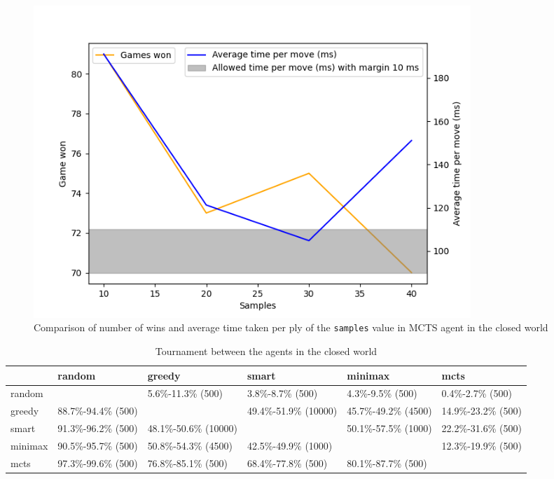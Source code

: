 \begin{figure}[h]
  \centering
  \captionsetup{justification=centering}
  \includegraphics[width=0.8\textwidth]{../img/mcts_samples_closedworld.png}
  \caption{Comparison of number of wins and average time taken per ply of the \texttt{samples} value in MCTS agent in the closed world}
  \label{mctsCWSamples}
\end{figure}

\begin{table}[!ht]
    \centering
    \captionsetup{justification=centering}
    \begin{tabularx}{\textwidth}{|X|X|X|X|X|X|}
    \hline
        ~ & random & greedy & smart & minimax & mcts \\ \hline
        random & ~ & \footnotesize{5.6\%-11.3\% (500)} & \footnotesize{3.8\%-8.7\% (500)} & \footnotesize{4.3\%-9.5\% (500)} & \footnotesize{0.4\%-2.7\% (500)} \\ \hline
        greedy & \footnotesize{88.7\%-94.4\% (500)} & ~ & \footnotesize{49.4\%-51.9\% (10000)} & \footnotesize{45.7\%-49.2\% (4500)} & \footnotesize{14.9\%-23.2\% (500)} \\ \hline
        smart & \footnotesize{91.3\%-96.2\% (500)} & \footnotesize{48.1\%-50.6\% (10000)} & ~ & \footnotesize{50.1\%-57.5\% (1000)} & \footnotesize{22.2\%-31.6\% (500)} \\ \hline
        minimax & \footnotesize{90.5\%-95.7\% (500)} & \footnotesize{50.8\%-54.3\% (4500)} & \footnotesize{42.5\%-49.9\% (1000)} & ~ & \footnotesize{12.3\%-19.9\% (500)} \\ \hline
        mcts & \footnotesize{97.3\%-99.6\% (500)} & \footnotesize{76.8\%-85.1\% (500)} & \footnotesize{68.4\%-77.8\% (500)} & \footnotesize{80.1\%-87.7\% (500)} & \\ \bottomrule
    \end{tabularx}
    \caption{Tournament between the agents in the closed world}
    \label{tournamentClosedWorld}
\end{table}

